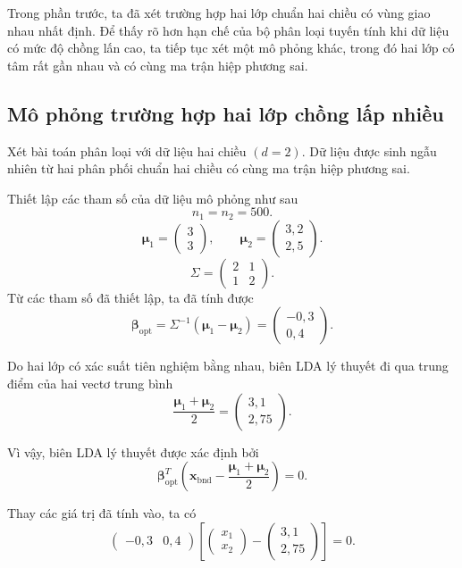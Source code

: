 Trong phần trước, ta đã xét trường hợp hai lớp chuẩn hai chiều có vùng giao nhau nhất định. Để thấy rõ hơn hạn chế của bộ phân loại tuyến tính khi dữ liệu có mức độ chồng lấn cao, ta tiếp tục xét một mô phỏng khác, trong đó hai lớp có tâm rất gần nhau và có cùng ma trận hiệp phương sai.

\subsection{Mô phỏng trường hợp hai lớp chồng lấp nhiều}
Xét bài toán phân loại với dữ liệu hai chiều $(d=2)$. Dữ liệu được sinh ngẫu nhiên từ hai phân phối chuẩn hai chiều có cùng ma trận hiệp phương sai.

Thiết lập các tham số của dữ liệu mô phỏng như sau
\[
n_1=n_2=500.
\]
\[
\bm{\mu}_1=
\begin{pmatrix}
	3\\
	3
\end{pmatrix},
\qquad
\bm{\mu}_2=
\begin{pmatrix}
	3{,}2\\
	2{,}5
\end{pmatrix}.
\]
\[
\Sigma
=
\begin{pmatrix}
	2 & 1\\
	1 & 2
\end{pmatrix}.
\]
Từ các tham số đã thiết lập, ta đã tính được
\[
\bm{\beta}_{\text{opt}}
=
\Sigma^{-1}(\bm{\mu}_1-\bm{\mu}_2)
=
\begin{pmatrix}
	-0{,}3\\
	0{,}4
\end{pmatrix}.
\]

Do hai lớp có xác suất tiên nghiệm bằng nhau, biên LDA lý thuyết đi qua trung điểm của hai vectơ trung bình
\[
\frac{\bm{\mu}_1+\bm{\mu}_2}{2}
=
\begin{pmatrix}
	3{,}1\\
	2{,}75
\end{pmatrix}.
\]

Vì vậy, biên LDA lý thuyết được xác định bởi
\[
\bm{\beta}_{\text{opt}}^T
\left(
\bm{x}_{\text{bnd}}
-
\frac{\bm{\mu}_1+\bm{\mu}_2}{2}
\right)
=
0.
\]

Thay các giá trị đã tính vào, ta có
\[
\begin{pmatrix}
	-0{,}3 & 0{,}4
\end{pmatrix}
\left[
\begin{pmatrix}
	x_1\\
	x_2
\end{pmatrix}
-
\begin{pmatrix}
	3{,}1\\
	2{,}75
\end{pmatrix}
\right]
=
0.
\]

